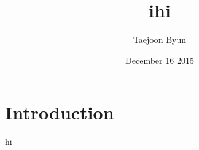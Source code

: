 \documentclass{article}
\title{ihi}
\author{Taejoon Byun}
\date{December 16 2015}
\begin{document}
\section{Introduction}
hi
\end{document}
